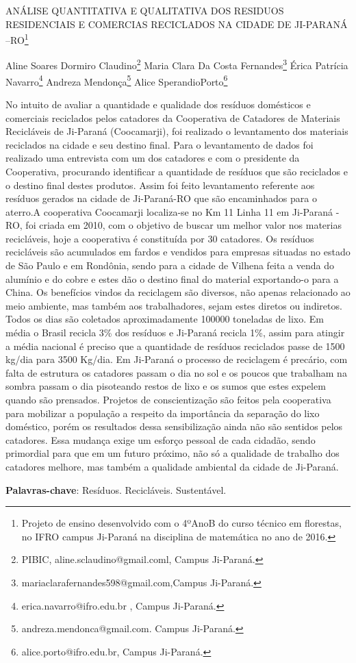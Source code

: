 \documentclass[article,12pt,onesidea,4paper,english,brazil]{abntex2}
\begin{document}
	
	
	\frenchspacing 
	
	\begin{center}
		\LARGE ANÁLISE QUANTITATIVA E QUALITATIVA DOS RESIDUOS RESIDENCIAIS E COMERCIAS RECICLADOS NA CIDADE DE JI-PARANÁ –RO\footnote{Projeto de ensino desenvolvido com o 4ºAnoB do curso técnico em florestas, no IFRO campus Ji-Paraná na disciplina de matemática no ano de 2016.}
		
		\normalsize
		Aline Soares Dormiro Claudino\footnote{PIBIC, aline.sclaudino@gmail.coml, Campus Ji-Paraná.} 
		Maria Clara Da Costa Fernandes\footnote{mariaclarafernandes598@gmail.com,Campus Ji-Paraná.}
		Érica Patrícia Navarro\footnote{erica.navarro@ifro.edu.br , Campus Ji-Paraná.}
		Andreza Mendonça\footnote{andreza.mendonca@gmail.com. Campus Ji-Paraná.}
		Alice SperandioPorto\footnote{alice.porto@ifro.edu.br, Campus Ji-Paraná.}
	\end{center}
	
	\noindent No intuito de avaliar a quantidade e qualidade dos resíduos domésticos e comerciais reciclados pelos catadores da Cooperativa de Catadores de Materiais Recicláveis de Ji-Paraná (Coocamarji), foi realizado o levantamento dos materiais reciclados na cidade e seu destino final. Para o levantamento de dados foi realizado uma entrevista com um dos catadores e com o presidente da Cooperativa, procurando identificar a quantidade de resíduos que são reciclados e o destino final destes produtos. Assim foi feito levantamento referente aos resíduos gerados na cidade de Ji-Paraná-RO que são encaminhados para o aterro.A cooperativa Coocamarji localiza-se no Km 11 Linha 11 em Ji-Paraná - RO, foi criada em 2010, com o objetivo de buscar um melhor valor nos materias recicláveis, hoje a cooperativa é constituída por 30 catadores. Os resíduos recicláveis são acumulados em fardos e vendidos para empresas situadas no estado de São Paulo e em Rondônia, sendo para a cidade de Vilhena feita a venda do alumínio e do cobre e estes dão o destino final do material exportando-o para a China. Os benefícios vindos da reciclagem são diversos, não apenas relacionado ao meio ambiente, mas também aos trabalhadores, sejam estes diretos ou indiretos. Todos os dias são coletados aproximadamente 100000 toneladas de lixo. Em média o Brasil recicla 3\% dos resíduos e Ji-Paraná recicla 1\%, assim para atingir a média nacional é preciso que a quantidade de resíduos reciclados passe de 1500 kg/dia para 3500 Kg/dia. Em Ji-Paraná o processo de reciclagem é precário, com falta de estrutura os catadores passam o dia no sol e os poucos que trabalham na sombra passam o dia pisoteando restos de lixo e os sumos que estes expelem quando são prensados. Projetos de conscientização são feitos pela cooperativa para mobilizar a população a respeito da importância da separação do lixo doméstico, porém os resultados dessa sensibilização ainda não são sentidos pelos catadores. Essa mudança exige um esforço pessoal de cada cidadão, sendo primordial para que em um futuro próximo, não só a qualidade de trabalho dos catadores melhore, mas também a qualidade ambiental da cidade de Ji-Paraná.
	
	\vspace{\onelineskip}
	
	\noindent
	\textbf{Palavras-chave}: Resíduos. Recicláveis. Sustentável.
	
\end{document}
